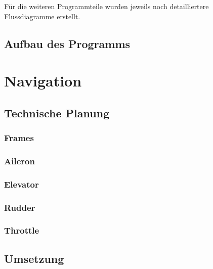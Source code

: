 \begin{itemize}
  Für die weiteren Programmteile wurden jeweils noch detailliertere Flussdiagramme erstellt.

  \subsection{Aufbau des Programms}






\section{Navigation}

  \subsection{Technische Planung}



    \subsubsection{Frames}



    \subsubsection{Aileron}
    \subsubsection{Elevator}
    \subsubsection{Rudder}


    \subsubsection{Throttle}

  \subsection{Umsetzung}


\end{itemize}
